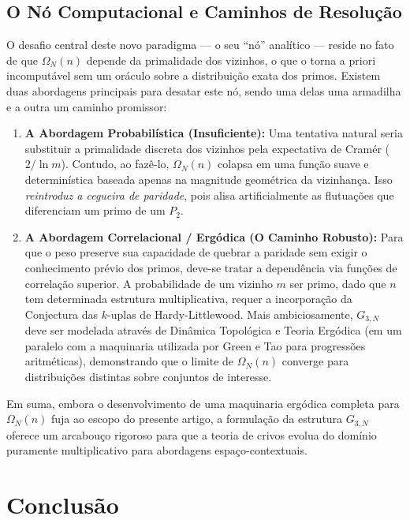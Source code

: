 \documentclass[12pt,a4paper]{article}
\theoremstyle{remark}
\begin{document}
	\subsection{O Nó Computacional e Caminhos de Resolução}
	
	O desafio central deste novo paradigma --- o seu ``nó'' analítico --- reside no fato de que $\Omega_N(n)$ depende da primalidade dos vizinhos, o que o torna a priori incomputável sem um oráculo sobre a distribuição exata dos primos. Existem duas abordagens principais para desatar este nó, sendo uma delas uma armadilha e a outra um caminho promissor:
	
	\begin{enumerate}
		\item \textbf{A Abordagem Probabilística (Insuficiente):} Uma tentativa natural seria substituir a primalidade discreta dos vizinhos pela expectativa de Cramér ($2/\ln m$). Contudo, ao fazê-lo, $\Omega_N(n)$ colapsa em uma função suave e determinística baseada apenas na magnitude geométrica da vizinhança. Isso \textit{reintroduz a cegueira de paridade}, pois alisa artificialmente as flutuações que diferenciam um primo de um $P_2$.
		
		\item \textbf{A Abordagem Correlacional / Ergódica (O Caminho Robusto):} Para que o peso preserve sua capacidade de quebrar a paridade sem exigir o conhecimento prévio dos primos, deve-se tratar a dependência via funções de correlação superior. A probabilidade de um vizinho $m$ ser primo, dado que $n$ tem determinada estrutura multiplicativa, requer a incorporação da Conjectura das $k$-uplas de Hardy-Littlewood. Mais ambiciosamente, $G_{3,N}$ deve ser modelada através de Dinâmica Topológica e Teoria Ergódica (em um paralelo com a maquinaria utilizada por Green e Tao para progressões aritméticas), demonstrando que o limite de $\Omega_N(n)$ converge para distribuições distintas sobre conjuntos de interesse.
	\end{enumerate}
	
	Em suma, embora o desenvolvimento de uma maquinaria ergódica completa para $\Omega_N(n)$ fuja ao escopo do presente artigo, a formulação da estrutura $G_{3,N}$ oferece um arcabouço rigoroso para que a teoria de crivos evolua do domínio puramente multiplicativo para abordagens espaço-contextuais.
	
	
	\section{Conclus\~ao}
	
\end{document}
